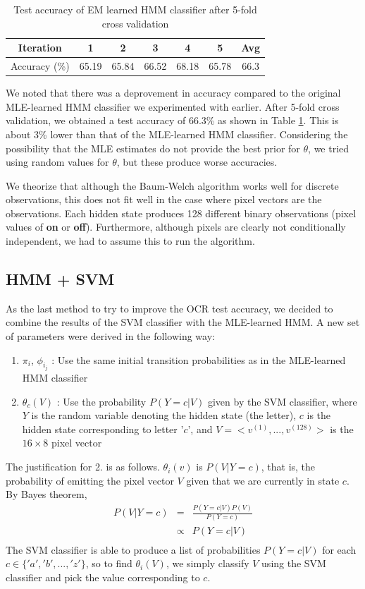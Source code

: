 \documentclass{article} %
\begin{document}
\begin{table}[h]
\centering
\begin{tabular}{|c|c|c|c|c|c|c|}
\hline
Iteration & 1 & 2 & 3 & 4 & 5 & Avg \\
\hline 
Accuracy (\%) & 65.19 & 65.84 & 66.52 & 68.18 & 65.78 & 66.3 \\
\hline 
\end{tabular}
\caption{Test accuracy of EM learned HMM classifier after 5-fold cross validation}
\label{tab:bw-cross-val}
\end{table}

We noted that there was a deprovement in accuracy compared to the original MLE-learned HMM classifier we experimented with earlier. After 5-fold cross validation, we obtained a test accuracy of 66.3\% as shown in Table \ref{tab:bw-cross-val}. This is about 3\% lower than that of the MLE-learned HMM classifier. Considering the possibility that the MLE estimates do not provide the best prior for $\theta$, we tried using random values for $\theta$, but these produce worse accuracies.

We theorize that although the Baum-Welch algorithm works well for discrete observations, this does not fit well in the case where pixel vectors are the observations. Each hidden state produces 128 different binary observations (pixel values of \textbf{on} or \textbf{off}). Furthermore, although pixels are clearly not conditionally independent, we had to assume this to run the algorithm.

\subsection{HMM + SVM}

As the last method to try to improve the OCR test accuracy, we decided to combine the results of the SVM classifier with the MLE-learned HMM. A new set of parameters were derived in the following way:
\begin{enumerate}
	\item $\pi_i$, $\phi_{i_j}$ : Use the same initial transition probabilities as in the MLE-learned HMM classifier
	\item $\theta_c(V)$ : Use the probability $P(Y=c|V)$ given by the SVM classifier, where $Y$ is the random variable denoting the hidden state (the letter), $c$ is the hidden state corresponding to letter '$c$', and $V = <v^{(1)}, ..., v^{(128)}>$ is the $16 \times 8$ pixel vector
\end{enumerate}
The justification for 2. is as follows. $\theta_i(v)$ is $P(V|Y=c)$, that is, the probability of emitting the pixel vector $V$ given that we are currently in state $c$. By Bayes theorem, 
\begin{eqnarray*}
	P(V|Y=c) &=& \frac{P(Y=c|V)P(V)}{P(Y=c)} \\
	&\propto & P(Y=c|V) \\
\end{eqnarray*}
The SVM classifier is able to produce a list of probabilities $P(Y = c | V)$ for each  $c \in \{'a', 'b', ..., 'z'\}$, so to find $\theta_i(V)$, we simply classify $V$ using the SVM classifier and pick the value corresponding to $c$.
\end{document}
